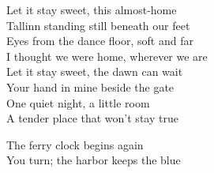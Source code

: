 \begin{lyrics}
Let it stay sweet, this almost-home\\
Tallinn standing still beneath our feet\\
Eyes from the dance floor, soft and far\\
I thought we were home, wherever we are\\
Let it stay sweet, the dawn can wait\\
Your hand in mine beside the gate\\
One quiet night, a little room\\
A tender place that won't stay true

The ferry clock begins again\\
You turn; the harbor keeps the blue
\end{lyrics}

